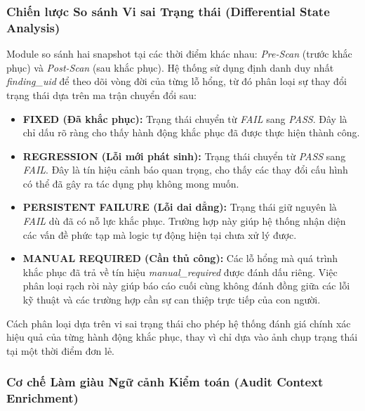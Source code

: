 \subsubsection*{Chiến lược So sánh Vi sai Trạng thái (Differential State Analysis)}

Module so sánh hai snapshot tại các thời điểm khác nhau: \textit{Pre-Scan} (trước khắc phục) và \textit{Post-Scan} (sau khắc phục).
Hệ thống sử dụng
định danh duy nhất
\textit{finding\_uid}
để theo dõi
vòng đời
của từng lỗ hổng,
từ đó phân loại
sự thay đổi trạng thái
dựa trên
ma trận chuyển đổi sau:

\begin{itemize}
  \item \textbf{FIXED (Đã khắc phục):}
    Trạng thái chuyển từ
    \textit{FAIL}
    sang
    \textit{PASS}.
    Đây là chỉ dấu rõ ràng
    cho thấy
    hành động khắc phục
    đã được thực hiện
    thành công.

  \item \textbf{REGRESSION (Lỗi mới phát sinh):}
    Trạng thái chuyển từ
    \textit{PASS}
    sang
    \textit{FAIL}.
    Đây là tín hiệu cảnh báo quan trọng,
    cho thấy
    các thay đổi cấu hình
    có thể đã gây ra
    tác dụng phụ
    không mong muốn.

  \item \textbf{PERSISTENT FAILURE (Lỗi dai dẳng):}
    Trạng thái giữ nguyên
    là
    \textit{FAIL}
    dù đã có
    nỗ lực khắc phục.
    Trường hợp này
    giúp hệ thống
    nhận diện
    các vấn đề phức tạp
    mà logic tự động hiện tại
    chưa xử lý được.

  \item \textbf{MANUAL REQUIRED (Cần thủ công):}
    Các lỗ hổng
    mà quá trình khắc phục
    đã trả về
    tín hiệu
    \textit{manual\_required}
    được đánh dấu riêng.
    Việc phân loại rạch ròi này
    giúp báo cáo cuối cùng
    không đánh đồng
    giữa các lỗi kỹ thuật
    và các trường hợp
    cần sự can thiệp
    trực tiếp của con người.
\end{itemize}

Cách phân loại dựa trên vi sai trạng thái cho phép hệ thống đánh giá chính xác hiệu quả của từng hành động khắc phục, thay vì chỉ dựa vào ảnh chụp trạng thái tại một thời điểm đơn lẻ.

\subsubsection*{Cơ chế Làm giàu Ngữ cảnh Kiểm toán (Audit Context Enrichment)}

